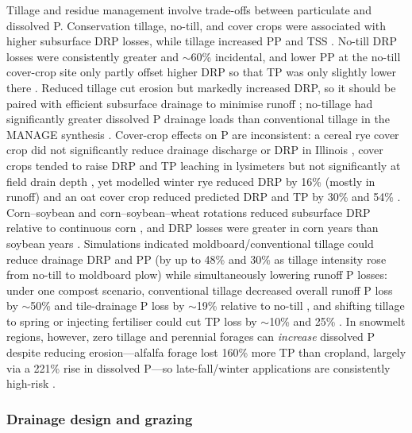 \documentclass[11pt]{article}
\begin{document}
Tillage and residue management involve trade-offs between particulate and dissolved P.
Conservation tillage, no-till, and cover crops were associated with higher subsurface DRP
losses, while tillage increased PP and TSS \parencite{Ni2020,Macrae2023}. No-till DRP losses were
consistently greater and $\sim$60\% incidental, and lower PP at the no-till cover-crop site only
partly offset higher DRP so that TP was only slightly lower there \parencite{Macrae2023}. Reduced
tillage cut erosion but markedly increased DRP, so it should be paired with efficient subsurface
drainage to minimise runoff \parencite{Koskiaho2002}; no-tillage had significantly greater
dissolved P drainage loads than conventional tillage in the MANAGE synthesis
\parencite{Christianson2016}. Cover-crop effects on P are inconsistent: a cereal rye cover crop
did not significantly reduce drainage discharge or DRP in Illinois \parencite{deOliveira2022},
cover crops tended to raise DRP and TP leaching in lysimeters but not significantly at field drain
depth \parencite{Liu2019}, yet modelled winter rye reduced DRP by 16\% (mostly in runoff)
\parencite{Grewal2025} and an oat cover crop reduced predicted DRP and TP by 30\% and 54\%
\parencite{Askar2021b}. Corn--soybean and corn--soybean--wheat rotations reduced subsurface DRP
relative to continuous corn \parencite{Ni2020}, and DRP losses were greater in corn years than
soybean years \parencite{Zhang2015}. Simulations indicated moldboard/conventional tillage could reduce
drainage DRP and PP (by up to 48\% and 30\% as tillage intensity rose from no-till to
moldboard plow) while simultaneously lowering runoff P losses: under one compost scenario,
conventional tillage decreased overall runoff P loss by $\sim$50\% and tile-drainage P loss by
$\sim$19\% relative to no-till \parencite{Pan2023}, and shifting tillage to spring or injecting fertiliser could cut TP loss by
$\sim$10\% and 25\% \parencite{Qi2018}. In snowmelt regions, however, zero tillage and perennial
forages can \emph{increase} dissolved P despite reducing erosion---alfalfa forage lost 160\% more
TP than cropland, largely via a 221\% rise in dissolved P---so late-fall/winter applications are
consistently high-risk \parencite{Baulch2019}.

\subsubsection{Drainage design and grazing}
\end{document}
